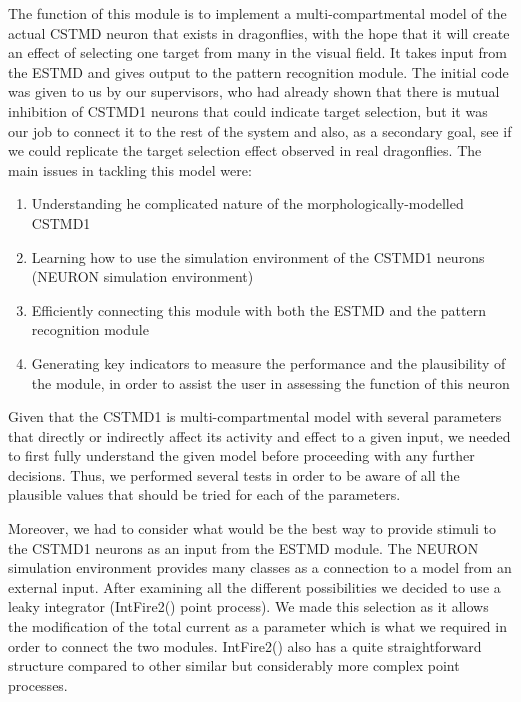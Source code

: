 \documentclass[a4paper,11pt]{article}
\begin{document}
The function of this module is to implement a multi-compartmental model of the actual CSTMD neuron that exists in dragonflies, with the hope that it will create an effect of selecting one target from many in the visual field. It takes input from the ESTMD and gives output to the pattern recognition module. The initial code was given to us by our supervisors, who had already shown that there is mutual inhibition of CSTMD1 neurons that could indicate target selection, but it was our job to connect it to the rest of the system and also, as a secondary goal, see if we could replicate the target selection effect observed in real dragonflies. The main issues in tackling this model were:
\begin{enumerate}
	\item Understanding he complicated nature of the morphologically-modelled CSTMD1
	\item Learning how to use the simulation environment of the CSTMD1 neurons (NEURON simulation environment)\cite{neuron}
	\item Efficiently connecting this module with both the ESTMD and the pattern recognition module
	\item Generating key indicators to measure the performance and the plausibility of the module, in order to assist the user in assessing the function of this neuron
\end{enumerate}

Given that the CSTMD1 is multi-compartmental model with several parameters that directly or indirectly affect its activity and effect to a given input, we needed to first fully understand the given model before proceeding with any further decisions. Thus, we performed several tests in order to be aware of all the plausible values that should be tried for each of the parameters.

Moreover, we had to consider what would be the best way to provide stimuli to the CSTMD1 neurons as an input from the ESTMD module. The NEURON simulation environment provides many classes as a connection to a model from an external input. After examining all the different possibilities we decided to use a leaky integrator (IntFire2() point process). We made this selection as it allows the modification of the total current as a parameter which is what we required in order to connect the two modules. IntFire2() also has a quite straightforward structure compared to other similar but considerably more complex point processes. 
\end{document}
